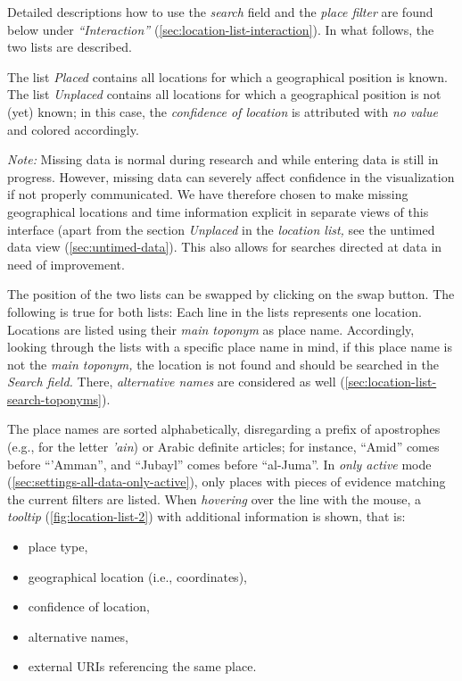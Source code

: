 Detailed descriptions how to use the \emph{search} field and the \emph{place filter} are found below under \emph{\enquote{Interaction}} (\cref{sec:location-list-interaction}).
In what follows, the two lists are described.

\label{sec:location-list-unplaced}
The list \emph{Placed} contains all locations for which a geographical position is known.
The list \emph{Unplaced} contains all locations for which a geographical position is not (yet) known;
in this case, the \emph{confidence of location} is attributed with \emph{no value} and colored accordingly.

\emph{Note:} Missing data is normal during research and while entering data is still in progress.
However, missing data can severely affect confidence in the visualization if not properly communicated.
We have therefore chosen to make missing geographical locations and time information explicit in separate views of this interface (apart from the section \emph{Unplaced} in the \emph{location list,} see the untimed data view (\cref{sec:untimed-data}).
This also allows for searches directed at data in need of improvement.

The position of the two lists can be swapped by clicking on the swap button.
The following is true for both lists:
Each line in the lists represents one location.
Locations are listed using their \emph{main toponym} as place name.
Accordingly, looking through the lists with a specific place name in mind, if this place name is not the \emph{main toponym,} the location is not found and should be searched in the \emph{Search field.}
There, \emph{alternative names} are considered as well (\cref{sec:location-list-search-toponyms}).

The place names are sorted alphabetically, disregarding a prefix of apostrophes (e.g., for the letter \emph{'ain}) or Arabic definite articles;
for instance, \enquote{Amid} comes before \enquote{'Amman}, and \enquote{Jubayl} comes before \enquote{al-Juma}.
In \emph{only active} mode (\cref{sec:settings-all-data-only-active}), only places with pieces of evidence matching the current filters are listed.
When \emph{hovering} over the line with the mouse, a \emph{tooltip} (\cref{fig:location-list-2}) with additional information is shown, that is:

\begin{itemize}
  \item place type,
  \item geographical location (i.e., coordinates),
  \item confidence of location,
  \item alternative names,
  \item external URIs referencing the same place.
\end{itemize}


